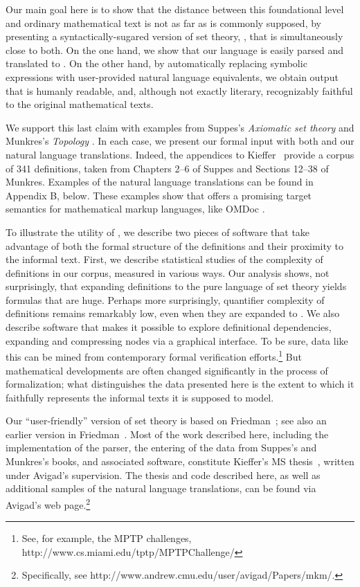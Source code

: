 \documentclass{llncs}
\begin{document}
Our main goal here is to show that the distance between this
foundational level and ordinary mathematical text is not as far as is
commonly supposed, by presenting a syntactically-sugared version of
set theory, , that is simultaneously close to both. On the
one hand, we show that our language is easily parsed and translated to
. On the other hand, by automatically replacing symbolic
expressions with user-provided natural language equivalents, we obtain
output that is humanly readable, and, although not exactly literary,
recognizably faithful to the original mathematical texts. 

We support this last claim with examples from Suppes's \emph{Axiomatic
  set theory} \cite{suppes} and Munkres's \emph{Topology}
\cite{munkres}. In each case, we present our formal input with both
 and our natural language translations.
Indeed, the appendices to
Kieffer~\cite{kieffer:07} provide a corpus of 341 definitions, taken
from Chapters 2--6 of Suppes and Sections 12--38 of Munkres. Examples
of the natural language translations can be found in Appendix B,
below. These examples show that  offers a promising target
semantics for mathematical markup languages, like OMDoc
\cite{kohlhase:06}.

To illustrate the utility of , we describe two pieces of
software that take advantage of both the formal structure of the
definitions and their proximity to the informal text.  First, we
describe statistical studies of the complexity of definitions in our
corpus, measured in various ways. Our analysis shows, not
surprisingly, that expanding definitions to the pure language of set
theory yields formulas that are huge. Perhaps more surprisingly,
quantifier complexity of definitions remains remarkably low, even when
they are expanded to . We also describe software that makes
it possible to explore definitional dependencies, expanding and
compressing nodes via a graphical interface. To be sure, data like
this can be mined from contemporary formal verification
efforts.\footnote{See, for example, the MPTP challenges,
  http://www.cs.miami.edu/tptp/MPTPChallenge/} But mathematical
developments are often changed significantly in the process of
formalization; what distinguishes the data presented here is the
extent to which it faithfully represents the informal texts it is
supposed to model.

Our ``user-friendly'' version of set theory is based on
Friedman~\cite{friedman:unp:05}; see also an earlier version in
Friedman~\cite{friedman:flagg:90}. Most of the work described here,
including the implementation of the parser, the entering of the data
from Suppes's and Munkres's books, and associated software,
constitute Kieffer's MS thesis~\cite{kieffer:07}, written under
Avigad's supervision. The thesis and code described here, as well as
additional samples of the natural language translations, can be found
via Avigad's web page.\footnote{Specifically, see
  http://www.andrew.cmu.edu/user/avigad/Papers/mkm/.}
\end{document}
